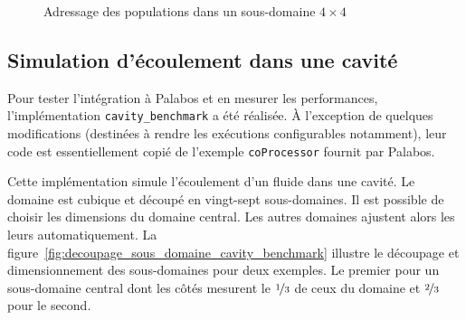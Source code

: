 \begin{figure}[h]
{		\label{fig:cp_index_z_3}
	}
	\caption{Adressage des populations dans un sous-domaine $4\times4$}
	\label{fig:adressage_cp}
\end{figure}

\subsection{Simulation d'écoulement dans une cavité} \label{title-cavity_benchmark}
Pour tester l'intégration à Palabos et en mesurer les performances, l'implémentation \texttt{cavity\_benchmark} a été réalisée. À l'exception de quelques modifications (destinées à rendre les exécutions configurables notamment), leur code est essentiellement copié de l'exemple \texttt{coProcessor} fournit par Palabos.

Cette implémentation simule l'écoulement d'un fluide dans une cavité. Le domaine est cubique et découpé en vingt-sept sous-domaines. Il est possible de choisir les dimensions du domaine central. Les autres domaines ajustent alors les leurs automatiquement. La figure~\ref{fig:decoupage_sous_domaine_cavity_benchmark} illustre le découpage et dimensionnement des sous-domaines pour deux exemples. Le premier pour un sous-domaine central dont les côtés mesurent le $\nicefrac{1}{3}$ de ceux du domaine et  $\nicefrac{2}{3}$ pour le second.

